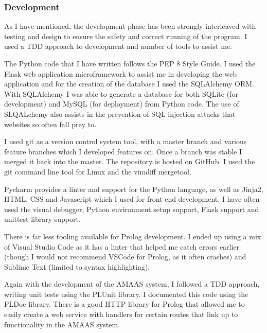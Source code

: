 \documentclass[]{final_report}
\begin{document}
\subsubsection{Development}
As I have mentioned, the development phase has been strongly interleaved with testing and design to ensure the safety and correct running of the program. I used a TDD approach to development and number of tools to assist me.\par 
The Python code that I have written follows the PEP 8 Style Guide. I used the Flask web application microframework to assist me in developing the web application and for the creation of the database I used the SQLAlchemy ORM. With SQLAlchemy I was able to generate a database for both SQLite (for development) and MySQL (for deployment) from Python code. The use of SLQALchemy also assists in the prevention of SQL injection attacks that websites so often fall prey to.\par 
I used git as a version control system tool, with a master branch and various feature branches which I developed features on. Once a branch was stable I merged it back into the master. The repository is hosted on GitHub. I used the git command line tool for Linux and the vimdiff mergetool.\par 
Pycharm provides a linter and support for the Python language, as well as Jinja2, HTML, CSS and Javascript which I used for front-end development. I have often used the visual debugger, Python environment setup support, Flask support and unittest library support.\par 
There is far less tooling available for Prolog development. I ended up using a mix of Visual Studio Code as it has a linter that helped me catch errors earlier (though I would not recommend VSCode for Prolog, as it often crashes) and Sublime Text (limited to syntax highlighting).\par 
Again with the development of the AMAAS system, I followed a TDD approach, writing unit tests using the PLUnit library. I documented this code using the PLDoc library. There is a good HTTP library for Prolog that allowed me to easily create a web service with handlers for certain routes that link up to functionality in the AMAAS system.
\end{document}
